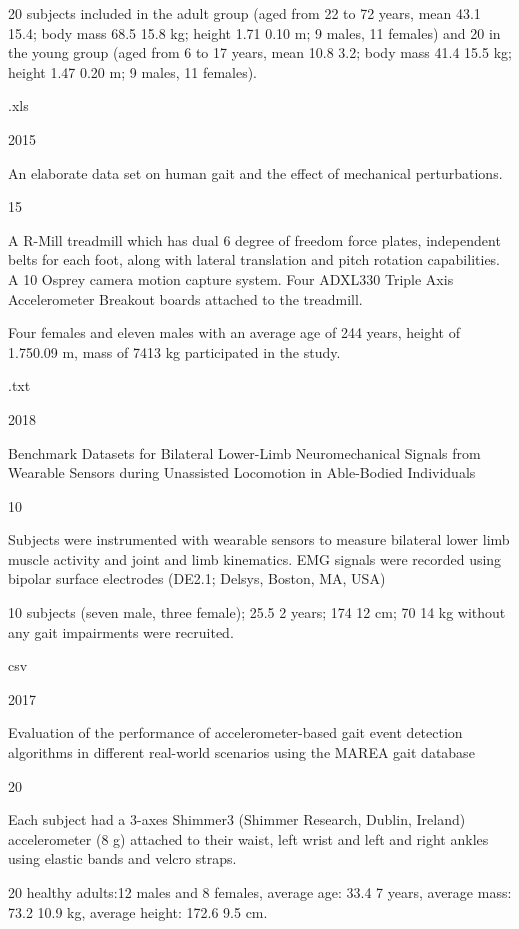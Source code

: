 \documentclass[11pt]{article}
\begin{document}
20 subjects included in the adult group (aged from 22 to 72 years, mean
43.1 15.4; body mass 68.5 15.8 kg; height 1.71 0.10 m; 9 males, 11
females) and 20 in the young group (aged from 6 to 17 years, mean 10.8
3.2; body mass 41.4 15.5 kg; height 1.47 0.20 m; 9 males, 11 females).

.xls

2015

An elaborate data set on human gait and the effect of mechanical
perturbations.

\cite{Moore2015}

15

A R-Mill treadmill which has dual 6 degree of freedom force plates,
independent belts for each foot, along with lateral translation and
pitch rotation capabilities. A 10 Osprey camera motion capture system.
Four ADXL330 Triple Axis Accelerometer Breakout boards attached to the
treadmill.

Four females and eleven males with an average age of 244 years, height
of 1.750.09 m, mass of 7413 kg participated in the study.

.txt

2018

Benchmark Datasets for Bilateral Lower-Limb Neuromechanical Signals from
Wearable Sensors during Unassisted Locomotion in Able-Bodied Individuals

\cite{Hu2018}

10

Subjects were instrumented with wearable sensors to measure bilateral
lower limb muscle activity and joint and limb kinematics. EMG signals
were recorded using bipolar surface electrodes (DE2.1; Delsys, Boston,
MA, USA)

10 subjects (seven male, three female); 25.5 2 years; 174 12 cm; 70 14
kg without any gait impairments were recruited.

csv

2017

Evaluation of the performance of accelerometer-based gait event
detection algorithms in different real-world scenarios using the MAREA
gait database

\cite{Khandelwal2017}

20

Each subject had a 3-axes Shimmer3 (Shimmer Research, Dublin, Ireland)
accelerometer (8 g) attached to their waist, left wrist and left and
right ankles using elastic bands and velcro straps.

20 healthy adults:12 males and 8 females, average age: 33.4 7 years,
average mass: 73.2 10.9 kg, average height: 172.6 9.5 cm.
\end{document}
